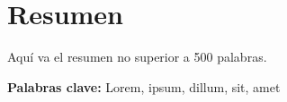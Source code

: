 \section*{Resumen}

Aquí va el resumen no superior a 500 palabras.

\textbf{Palabras clave:} Lorem, ipsum, dillum, sit, amet
